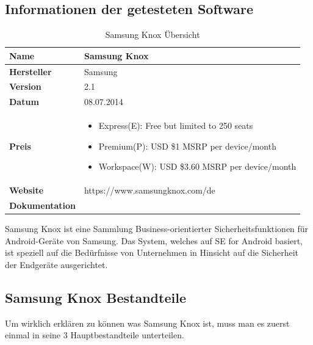 \subsection{Informationen der getesteten Software}
\begin{table}[h]
\centering
\begin{tabular}{|l|p{10cm}|}
\hline
\textbf{Name}          & Samsung Knox                                                                                           \\ \hline
\textbf{Hersteller}    & Samsung
\\ \hline
\textbf{Version}       & 2.1
\\ \hline
\textbf{Datum}         & 08.07.2014                                                                                               \\ \hline
\textbf{Preis}         & 

\begin{itemize}
	\item Express(E): Free but limited to 250 seats
	\item Premium(P): USD \$1 MSRP per device/month
	\item Workspace(W): USD \$3.60 MSRP per device/month
\end{itemize}
                                                                                                          \\ \hline
\textbf{Website}       & https://www.samsungknox.com/de 
\\ \hline
\textbf{Dokumentation} &                                                                      \\ \hline
\end{tabular}
\caption{Samsung Knox Übersicht}
\end{table}

Samsung Knox ist eine Sammlung Business-orientierter Sicherheitsfunktionen für Android-Geräte von Samsung. Das System, welches auf SE for Android basiert, ist speziell auf die Bedürfnisse von Unternehmen in Hinsicht auf die Sicherheit der Endgeräte ausgerichtet.

\subsection{Samsung Knox Bestandteile}
Um wirklich erklären zu können was Samsung Knox ist, muss man es zuerst einmal in seine 3 Hauptbestandteile unterteilen.
